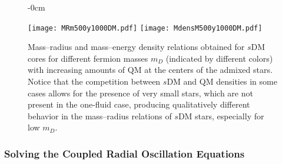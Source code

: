 \documentclass[universe,article,accept,moreauthors,pdftex]{Definitions/mdpi}
\begin{document}
\begin{figure}[H]\ContinuedFloat


\begin{adjustwidth}{-\extralength}{0cm}
\centering %

{\texttt{[image: MRm500y1000DM.pdf]}
	  \texttt{[image: MdensM500y1000DM.pdf]}}
\end{adjustwidth}
\caption{Mass--radius and mass--energy density relations obtained for $s$DM cores for different fermion masses $m_{D}$ (indicated by different colors) with increasing amounts of QM at the centers of the admixed stars. Notice that the competition between $s$DM and QM densities in some cases allows for the presence of very small stars, which are not present in the one-fluid case, producing qualitatively different behavior in the mass--radius relations of $s$DM stars, especially for low $m_{D}$.}
\label{fig:MRdens1000DM}

\end{figure}


\subsubsection{Solving the Coupled Radial Oscillation Equations}
\end{document}

